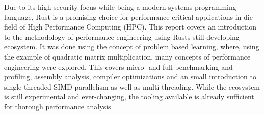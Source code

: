 Due to its high security focus while being a modern systems programming language, Rust is a promising choice for performance critical applications in die field of High Performance Computing (HPC). This report covers an introduction to the methodology of performance engineering using Rusts still developing ecosystem. It was done using the concept of problem based learning, where, using the example of quadratic matrix multiplication, many concepts of performance engineering were explored. This covers micro- and full benchmarking and profiling, assembly analysis, compiler optimizations and an small introduction to single threaded SIMD parallelism as well as multi threading. While the ecosystem is still experimental and ever-changing, the tooling available is already sufficient for thorough performance analysis.
